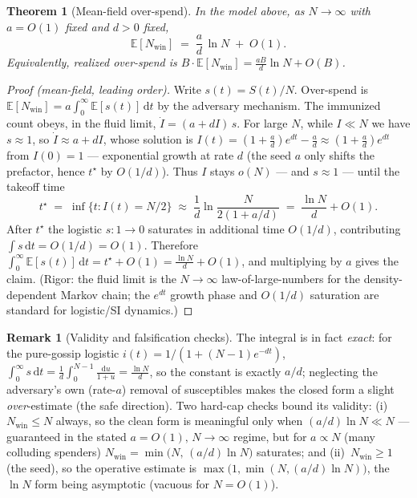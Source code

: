 \documentclass[11pt]{article}
\theoremstyle{plain}
\newtheorem{theorem}{Theorem}
\theoremstyle{definition}
\newtheorem{remark}{Remark}
\newcommand{\Nwin}{N_{\mathrm{win}}}
\newcommand{\E}{\mathbb{E}}
\begin{document}
\begin{theorem}[Mean-field over-spend]\label{thm:meanfield}
In the model above, as $N\to\infty$ with $a=O(1)$ fixed and $d>0$ fixed,
\[
\boxed{\;\E[\Nwin] \;=\; \frac{a}{d}\,\ln N \;+\; O(1).\;}
\]
Equivalently, realized over-spend is $B\cdot\E[\Nwin]=\frac{aB}{d}\ln N + O(B)$.
\end{theorem}

\begin{proof}[Proof (mean-field, leading order)]
Write $s(t)=S(t)/N$. Over-spend is $\E[\Nwin]=a\int_0^\infty \E[s(t)]\,\mathrm{d}t$
by the adversary mechanism. The immunized count obeys, in the fluid limit,
$\dot I = (a + dI)\,s$. For large $N$, while $I\ll N$ we have $s\approx1$, so
$\dot I \approx a + dI$, whose solution is $I(t) = (1+\tfrac{a}{d})e^{dt}-\tfrac{a}{d}
\approx (1+\tfrac{a}{d})e^{dt}$ from $I(0)=1$ --- exponential growth at rate $d$
(the seed $a$ only shifts the prefactor, hence $t^\star$ by $O(1/d)$). Thus $I$
stays $o(N)$ --- and $s\approx 1$ --- until the takeoff time
\[
t^\star \;=\; \inf\{t: I(t)=N/2\} \;\approx\; \frac{1}{d}\ln\frac{N}{2(1+a/d)} \;=\; \frac{\ln N}{d}+O(1).
\]
After $t^\star$ the logistic $s\!:\!1\to0$ saturates in additional time $O(1/d)$,
contributing $\int s\,\mathrm{d}t=O(1/d)=O(1)$.
Therefore $\int_0^\infty \E[s(t)]\,\mathrm{d}t = t^\star + O(1) = \frac{\ln N}{d}+O(1)$,
and multiplying by $a$ gives the claim. (Rigor: the fluid limit is the
$N\to\infty$ law-of-large-numbers for the density-dependent Markov chain; the
$e^{dt}$ growth phase and $O(1/d)$ saturation are standard for logistic/SI
dynamics.)
\end{proof}

\begin{remark}[Validity and falsification checks]\label{rem:thm1valid}
The integral is in fact \emph{exact}: for the pure-gossip logistic $i(t)=1/(1+(N-1)e^{-dt})$,
$\int_0^\infty s\,\mathrm{d}t=\tfrac1d\int_0^{N-1}\tfrac{\mathrm{d}u}{1+u}=\tfrac{\ln N}{d}$,
so the constant is exactly $a/d$; neglecting the adversary's own (rate-$a$) removal
of susceptibles makes the closed form a slight \emph{over}-estimate (the safe
direction). Two hard-cap checks bound its validity: (i)~$\Nwin\le N$ always, so the
clean form is meaningful only when $(a/d)\ln N\ll N$ --- guaranteed in the stated
$a=O(1),\,N\to\infty$ regime, but for $a\propto N$ (many colluding spenders)
$\Nwin=\min\!\big(N,\,(a/d)\ln N\big)$ saturates; and (ii)~$\Nwin\ge1$ (the seed),
so the operative estimate is $\max\!\big(1,\min(N,(a/d)\ln N)\big)$, the $\ln N$ form
being asymptotic (vacuous for $N=O(1)$).
\end{remark}
\end{document}

